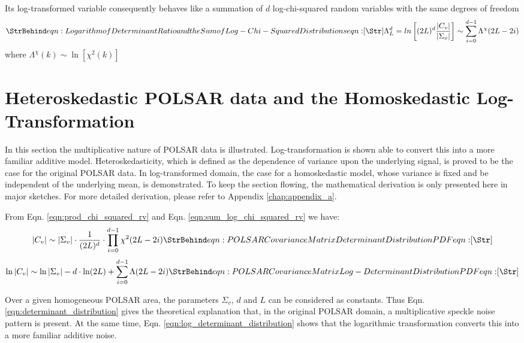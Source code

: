 Its log-transformed variable consequently 
  behaves like a summation of $d$ log-chi-squared random variables with the same degrees of freedom  
\begin{equation}
\label{eqn:sum_log_chi_squared_rv}
\caption{eqn:Logarithm of Determinant Ratio and the Sum of Log-Chi-Squared Distributions}
\Lambda^d_L = ln \left[ (2L)^d \frac{|C_v|}{|\Sigma_v|} \right] \sim \sum_{i=0}^{d-1} \Lambda^\chi (2L-2i)
\end{equation}
where $\Lambda^\chi (k) \sim \ln \left[ \chi^2 (k) \right]$

\section{Heteroskedastic POLSAR data and the Homoskedastic Log-Transformation}
\label{sec:polsar_heterosked_model_and_log_transform}

In this section the multiplicative nature of POLSAR data is illustrated.
Log-transformation is shown able to convert this into a more familiar additive model.
Heteroskedasticity, which is defined as the dependence of variance upon the underlying signal,
  is proved to be the case for the original POLSAR data.
In log-transformed domain, the case for a homoskedastic model,
  whose variance is fixed and be independent of the underlying mean,
  is demonstrated.
To keep the section flowing, the mathematical derivation is only presented here in major sketches.
For more detailed derivation, please refer to Appendix \ref{chap:appendix_a}.

From Eqn. \ref{eqn:prod_chi_squared_rv} and Eqn. \ref{eqn:sum_log_chi_squared_rv}
we have:
\begin{equation}
  |C_v| \sim |\Sigma_v| \cdot \frac{1}{(2L)^d} \cdot \prod_{i=0}^{d-1} \chi^2 (2L-2i)
  \label{eqn:determinant_distribution}
  \caption{eqn:POLSAR Covariance Matrix Determinant Distribution PDF}    
\end{equation}
\begin{equation}
  \ln|C_v| \sim \ln|\Sigma_v| - d \cdot \ln(2L) + \sum^{d-1}_{i=0} \Lambda(2L-2i)
  \label{eqn:log_determinant_distribution}  
  \caption{eqn:POLSAR Covariance Matrix Log-Determinant Distribution PDF}    
\end{equation}

Over a given homogeneous POLSAR area, the parameters $\Sigma_v$, $d$ and $L$ can be considered as constants.
Thus Eqn. \ref{eqn:determinant_distribution} gives the theoretical explanation that, 
  in the original POLSAR domain, a multiplicative speckle noise pattern is present.
At the same time, Eqn. \ref{eqn:log_determinant_distribution} shows that
  the logarithmic transformation converts this into a more familiar additive noise.  

